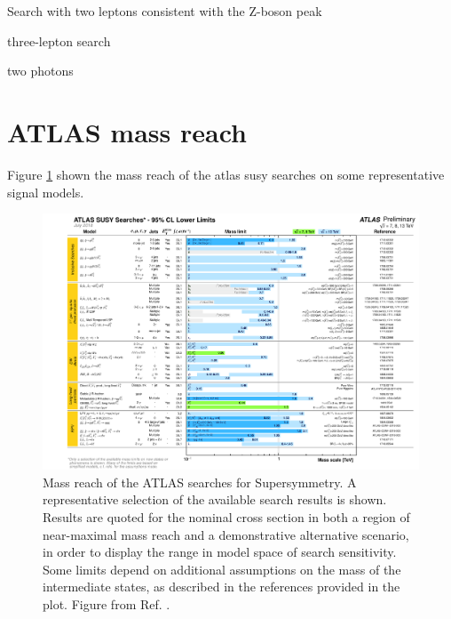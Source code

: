 Search with two leptons consistent with the Z-boson peak \cite{Sirunyan:2017qaj}

three-lepton search \cite{Sirunyan:2017lae}

two photons \cite{Sirunyan:2017eie}

\FloatBarrier


\section{ATLAS mass reach}

Figure \ref{fig:summary_atlas_summary} shown the mass reach of the \gls{atlas} \gls{susy} searches on 
some representative signal models. 

\begin{figure}[htbp]
	\centering
	\includegraphics[width=1\textwidth]{figures/summary_plots/ATLAS_SUSY_Summary.pdf}
	\caption{Mass reach of the ATLAS searches for Supersymmetry. 
	A representative selection of the available search results is shown. Results are quoted for the nominal cross section 
	in both a region of near-maximal mass reach and a demonstrative alternative scenario, in order to display the range in 
	model space of search sensitivity. Some limits depend on additional assumptions on the mass of the intermediate states, 
	as described in the references provided in the plot. Figure from Ref. \cite{atlasSUSYSummary}.
	} 
	\label{fig:summary_atlas_summary}
\end{figure}